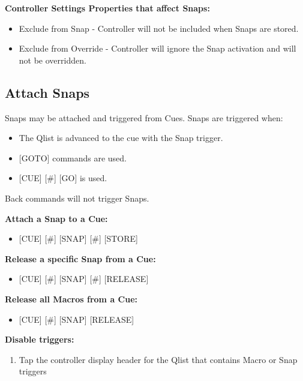 \documentclass[
]{article}
\providecommand{\tightlist}{%
  \setlength{\itemsep}{0pt}\setlength{\parskip}{0pt}}
\begin{document}
\textbf{Controller Settings Properties that affect Snaps:}

\begin{itemize}
\item
  Exclude from Snap - Controller will not be included when Snaps are stored.
\item
  Exclude from Override - Controller will ignore the Snap activation and will not be overridden.
\end{itemize}

\hypertarget{Attach-Snaps-12.3}{%
\subsection{Attach Snaps}\label{Attach-Snaps-12.3}}

Snaps may be attached and triggered from Cues.
Snaps are triggered when:

\begin{itemize}
\item
  The Qlist is advanced to the cue with the Snap trigger.
\item
  {[}GOTO{]} commands are used.
\item
  {[}CUE{]} {[}\#{]} {[}GO{]} is used.
\end{itemize}

{Back commands will not trigger Snaps.}

\textbf{Attach a Snap to a Cue:}

\begin{itemize}
\tightlist
\item
  {[}CUE{]} {[}\#{]} {[}SNAP{]} {[}\#{]} {[}STORE{]}
\end{itemize}

\textbf{Release a specific Snap from a Cue:}

\begin{itemize}
\tightlist
\item
  {[}CUE{]} {[}\#{]} {[}SNAP{]} {[}\#{]} {[}RELEASE{]}
\end{itemize}

\textbf{Release all Macros from a Cue:}

\begin{itemize}
\tightlist
\item
  {[}CUE{]} {[}\#{]} {[}SNAP{]} {[}RELEASE{]}
\end{itemize}

\textbf{Disable triggers:}

\begin{enumerate}
\def\labelenumi{\arabic{enumi}.}
\tightlist
\item
  Tap the controller display header for the Qlist that contains Macro or Snap triggers
\end{enumerate}
\end{document}
